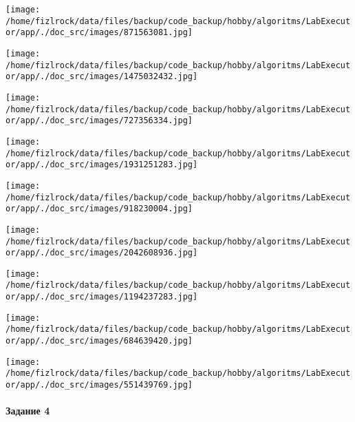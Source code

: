\documentclass[a4paper, 12pt]{article}
\begin{document}
\texttt{[image: /home/fizlrock/data/files/backup/code\_backup/hobby/algoritms/LabExecutor/app/./doc\_src/images/871563081.jpg]}

\texttt{[image: /home/fizlrock/data/files/backup/code\_backup/hobby/algoritms/LabExecutor/app/./doc\_src/images/1475032432.jpg]}

\texttt{[image: /home/fizlrock/data/files/backup/code\_backup/hobby/algoritms/LabExecutor/app/./doc\_src/images/727356334.jpg]}

\texttt{[image: /home/fizlrock/data/files/backup/code\_backup/hobby/algoritms/LabExecutor/app/./doc\_src/images/1931251283.jpg]}

\texttt{[image: /home/fizlrock/data/files/backup/code\_backup/hobby/algoritms/LabExecutor/app/./doc\_src/images/918230004.jpg]}

\texttt{[image: /home/fizlrock/data/files/backup/code\_backup/hobby/algoritms/LabExecutor/app/./doc\_src/images/2042608936.jpg]}

\texttt{[image: /home/fizlrock/data/files/backup/code\_backup/hobby/algoritms/LabExecutor/app/./doc\_src/images/1194237283.jpg]}

\texttt{[image: /home/fizlrock/data/files/backup/code\_backup/hobby/algoritms/LabExecutor/app/./doc\_src/images/684639420.jpg]}

\texttt{[image: /home/fizlrock/data/files/backup/code\_backup/hobby/algoritms/LabExecutor/app/./doc\_src/images/551439769.jpg]}
\pagebreak
\paragraph{Задание 4}
\end{document}
